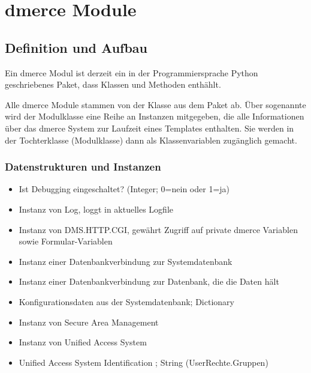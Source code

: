 \chapter{dmerce Module}

\newpage

\section{Definition und Aufbau}

Ein dmerce Modul ist derzeit ein in der Programmiersprache Python
geschriebenes Paket, dass Klassen und Methoden enth\"ahlt.

Alle dmerce Module stammen von der Klasse  aus dem
Paket  ab. \"Uber sogenannte 
wird der Modulklasse eine Reihe an Instanzen mitgegeben, die alle
Informationen \"uber das dmerce System zur Laufzeit eines Templates
enthalten.  Sie werden in der Tochterklasse (Modulklasse) dann als
Klassenvariablen zug\"anglich gemacht.

\subsection{Datenstrukturen und Instanzen}
\label{dmerceModulDatenstrukturenInstanzen}

\begin{itemize}
\item {} Ist Debugging eingeschaltet?
  (Integer; 0=nein oder 1=ja)
\item {} Instanz von Log, loggt in aktuelles Logfile %
\item {} Instanz von DMS.HTTP.CGI, gew\"ahrt
  Zugriff auf private dmerce Variablen  sowie
  Formular-Variablen 
\item {} Instanz einer Datenbankverbindung zur
  Systemdatenbank
\item {} Instanz einer Datenbankverbindung zur
  Datenbank, die die Daten h\"alt
\item {} Konfigurationsdaten aus der
  Systemdatenbank; Dictionary
\item {} Instanz von Secure Area Management
\item {} Instanz von Unified Access System
\item {} Unified Access System Identification
  ; String (UserRechte.Gruppen)
\end{itemize}


